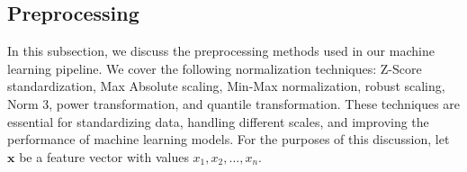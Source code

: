 \subsection{Preprocessing}
In this subsection, we discuss the preprocessing methods used in our machine learning pipeline.
We cover the following normalization techniques: Z-Score standardization, Max Absolute scaling, Min-Max normalization, robust scaling, Norm 3, power transformation, and quantile transformation.
These techniques are essential for standardizing data, handling different scales, and improving the performance of machine learning models.
For the purposes of this discussion, let $\mathbf{x}$ be a feature vector with values $x_1, x_2, \ldots, x_n$.









